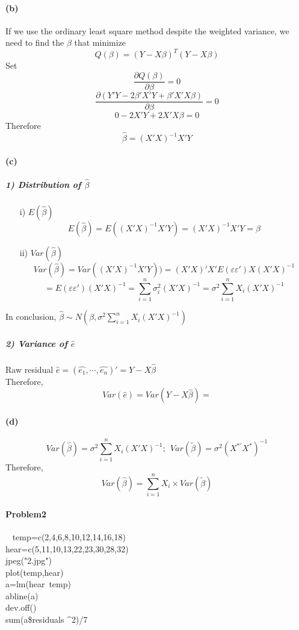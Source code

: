 \documentclass{article}
\begin{document}
\paragraph{(b)}
If we use the ordinary least square method despite the weighted variance, we need to find the $\beta$ that minimize 
\[Q(\beta)=(Y-X\beta )^T(Y-X\beta )\]
Set
\[\frac{\partial {Q}(\beta)}{\partial\beta}=0\] 
\[\frac{\partial (Y'Y-2\beta'X'Y+\beta'X'X\beta)}{\partial\beta}=0\]
\[0-2X'Y+2X'X\beta=0\]
Therefore \[\hat \beta=(X'X)^{-1}X'Y\]

\paragraph{(c)}
\subparagraph{1) Distribution of $\hat \beta$}
	\begin{itemize}
	\item [i)] $E(\hat \beta)$
	\[E(\hat \beta)=E((X'X)^{-1}X'Y)=(X'X)^{-1}X'Y=\beta\]
	\item[ii)] $Var(\hat \beta)$
	\[Var(\hat \beta)=Var((X'X)^{-1}X'Y))=(X'X)'X'E(\varepsilon \varepsilon')X(X'X)^{-1}
	\]
	\[=E(\varepsilon \varepsilon')(X'X)^{-1}=\sum_{i=1}^n\sigma_i^2(X'X)^{-1}=\sigma^2\sum_{i=1}^nX_i(X'X)^{-1}\]
	\end{itemize}

In conclusion, $\hat \beta \sim N(\beta,\sigma^2\sum_{i=1}^nX_i(X'X)^{-1} )$

\subparagraph{2) Variance of $\hat{e}$\\}
Raw residual $ \hat{e}=(\hat{e_1},\cdots,\hat{e_n})'=Y-X\hat \beta$\\
Therefore, 
\[Var(\hat{e})=Var(Y-X\hat \beta)=\]

\paragraph{(d)}
\[
Var(\hat \beta)=\sigma^2\sum_{i=1}^nX_i(X'X)^{-1}; \ \ Var(\tilde \beta)=\sigma^2(X^{*'}X^*)^{-1}
\]
Therefore, 
\[Var(\hat \beta)=\sum_{i=1}^nX_i \times Var(\tilde \beta)\]
\newpage
\appendixpage
\paragraph{Problem2}~{}
\newline
temp=c(2,4,6,8,10,12,14,16,18)\\
hear=c(5,11,10,13,22,23,30,28,32)\\
jpeg("2.jpg")\\
plot(temp,hear)\\
a=lm(hear~temp)\\
abline(a)\\
dev.off()\\
sum(a\$residuals $\^$2)/7\\
\end{document}

